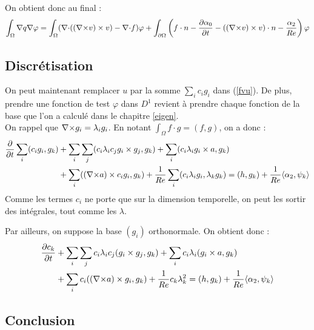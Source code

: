 
On obtient donc au final :
\begin{eqnarray}
\label{fvsol}
\int_\Omega {\nabla} q{\nabla}\varphi = \int_\Omega ({\nabla\cdot}(({\nabla\times} v)\times v) -{\nabla\cdot} f)\varphi + \int_{\partial\Omega} \left(f\cdot n - \frac{\partial\alpha_0}{\partial t} - (({\nabla\times} v)\times v)\cdot n - \frac{\alpha_2}{Re}\right)\varphi
\end{eqnarray}

\subsection{Discrétisation}

On peut maintenant remplacer $u$ par la somme $\sum_ic_ig_i$ dans (\ref{fvu}). De plus, prendre une fonction de test $\varphi$ dans $D^1$ revient à prendre chaque fonction de la base que l'on a calculé dans le chapitre \ref{eigen}.\\
On rappel que ${\nabla\times} g_i=\lambda_ig_i$. En notant $\int_\Omega f\cdot g=(f,g)$, on a donc :
\begin{align*}
\frac{\partial}{\partial t}\sum_i (c_ig_i, g_k) &+ \sum_i\sum_j (c_i\lambda_ic_jg_i\times g_j,g_k) + \sum_i(c_i\lambda_ig_i\times a,g_k)\\
&+ \sum_i (({\nabla\times} a)\times c_ig_i,g_k) + \frac{1}{Re}\sum_i(c_i\lambda_ig_i, \lambda_kg_k) = (h,g_k) + \frac{1}{Re}\langle\alpha_2,\psi_k\rangle
\end{align*}
Comme les termes $c_i$ ne porte que sur la dimension temporelle, on peut les
sortir des intégrales, tout comme les $\lambda$.


Par ailleurs, on suppose la base $(g_i)$ orthonormale. On obtient donc :
\begin{eqnarray}
\label{fvspec}
\begin{aligned}
\frac{\partial c_k}{\partial t} &+ \sum_i\sum_j c_i\lambda_i c_j(g_i\times g_j, g_k) + \sum_i c_i\lambda_i(g_i\times a,g_k)\\
&+ \sum_i c_i(({\nabla\times} a)\times g_i, g_k) + \frac{1}{Re}c_k\lambda_k^2 = (h,g_k) + \frac{1}{Re}\langle\alpha_2,\psi_k\rangle
\end{aligned}
\end{eqnarray}

\subsection{Conclusion}


